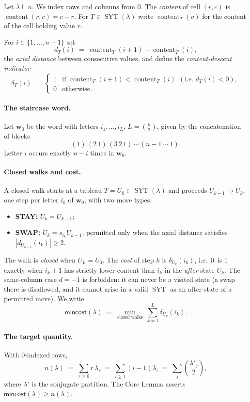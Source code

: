 \documentclass[11pt]{article}
\theoremstyle{plain}
\theoremstyle{remark}
\newcommand{\SYT}{\operatorname{SYT}}
\newcommand{\cont}{\operatorname{content}}
\newcommand{\mincost}{\mathsf{mincost}}
\begin{document}
Let $\lambda\vdash n$. We index rows and columns from $0$. The
\emph{content} of cell $(r,c)$ is $\cont(r,c)=c-r$. For $T\in\SYT(\lambda)$
write $\cont_T(v)$ for the content of the cell holding value $v$.

For $i\in\{1,\dots,n-1\}$ set
\[
  d_T(i)\;=\;\cont_T(i{+}1)-\cont_T(i),
\]
the \emph{axial distance} between consecutive values, and define the
\emph{content-descent indicator}
\[
  \delta_T(i)\;=\;
  \begin{cases}
    1 & \text{if } \cont_T(i{+}1)<\cont_T(i)\ \ (\text{i.e. } d_T(i)<0),\\
    0 & \text{otherwise.}
  \end{cases}
\]

\paragraph{The staircase word.}
Let $\mathbf{w}_0$ be the word with letters $i_1,\dots,i_L$,
$L=\binom{n}{2}$, given by the concatenation of blocks
\[
  (1)\,(2\,1)\,(3\,2\,1)\,\cdots\,(n{-}1\ \cdots\ 1).
\]
Letter $i$ occurs exactly $n-i$ times in $\mathbf{w}_0$.

\paragraph{Closed walks and cost.}
A closed walk starts at a tableau $T=U_0\in\SYT(\lambda)$ and proceeds
$U_{k-1}\to U_k$, one step per letter $i_k$ of $\mathbf{w}_0$, with two
move types:
\begin{itemize}
  \item \textbf{STAY:} $U_k=U_{k-1}$;
  \item \textbf{SWAP:} $U_k=s_{i_k}U_{k-1}$, permitted only when the axial
        distance satisfies $|d_{U_{k-1}}(i_k)|\ge 2$.
\end{itemize}
The walk is \emph{closed} when $U_L=U_0$. The \emph{cost} of step $k$ is
$\delta_{U_k}(i_k)$, i.e.\ it is $1$ exactly when $i_k{+}1$ has strictly
lower content than $i_k$ in the \emph{after}-state $U_k$. The same-column
case $d=-1$ is forbidden: it can never be a visited state (a swap there is
disallowed, and it cannot arise in a valid $\SYT$ as an after-state of a
permitted move). We write
\[
  \mincost(\lambda)\;=\;\min_{\text{closed walks}}\ \sum_{k=1}^{L}\delta_{U_k}(i_k).
\]

\paragraph{The target quantity.}
With $0$-indexed rows,
\[
  n(\lambda)\;=\;\sum_{r\ge 0} r\,\lambda_r
            \;=\;\sum_{i\ge 1}(i-1)\lambda_i
            \;=\;\sum_{j}\binom{\lambda'_j}{2},
\]
where $\lambda'$ is the conjugate partition. The Core Lemma asserts
$\mincost(\lambda)\ge n(\lambda)$.
\end{document}
